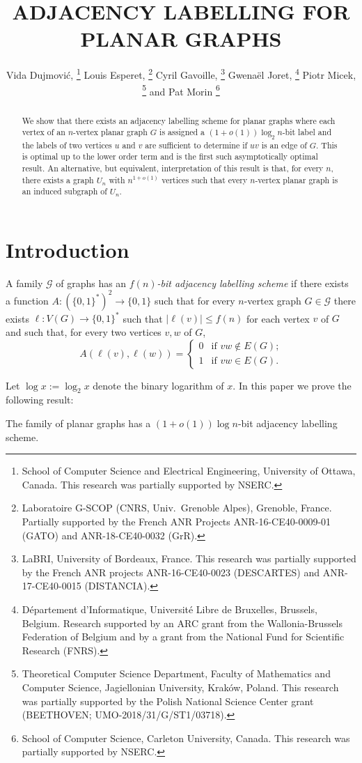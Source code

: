 \documentclass[kpfonts]{patmorin}
\title{\MakeUppercase{Adjacency Labelling for Planar Graphs}}
\author{
  Vida Dujmović,%
    \thanks{School of Computer Science and Electrical Engineering, University of Ottawa, Canada. This research was partially supported by NSERC.}\quad
  Louis Esperet,%
    \thanks{Laboratoire G-SCOP (CNRS, Univ.\ Grenoble Alpes), Grenoble, France. Partially supported by the French ANR Projects ANR-16-CE40-0009-01 (GATO) and ANR-18-CE40-0032 (GrR).}\quad
  Cyril Gavoille,%
    \thanks{LaBRI, University of Bordeaux, France. This research was partially supported by the French ANR projects ANR-16-CE40-0023 (DESCARTES) and ANR-17-CE40-0015 (DISTANCIA).}\quad
  Gwenaël Joret,%
     \thanks{Département d'Informatique, Université Libre de Bruxelles, Brussels, Belgium. Research supported by an ARC grant from the Wallonia-Brussels Federation of Belgium and by a grant from the National Fund for Scientific Research (FNRS).}\quad
  Piotr Micek,%
    \thanks{Theoretical Computer Science Department, Faculty of Mathematics and Computer Science, Jagiellonian University, Krak\'{o}w, Poland. This research was partially supported by the Polish National Science Center grant (BEETHOVEN; UMO-2018/31/G/ST1/03718).}\newline
  and Pat Morin%
    \thanks{School of Computer Science, Carleton University, Canada. This research was partially supported by NSERC.}
}
\date{}
\let\le\leqslant
\begin{document}
\begin{titlepage}
\maketitle

\begin{abstract}
  We show that there exists an adjacency labelling scheme for planar graphs where each vertex of an $n$-vertex planar graph $G$ is assigned a $(1+o(1))\log_2 n$-bit label and the labels of two vertices $u$ and $v$ are sufficient to determine if $uv$ is an edge of $G$.  This is optimal up to the lower order term and is the first such asymptotically optimal result.  An alternative, but equivalent, interpretation of this result is that, for every $n$, there exists a graph $U_n$ with $n^{1+o(1)}$ vertices such that every $n$-vertex planar graph is an induced subgraph of $U_n$. 
\end{abstract}
\end{titlepage}
\tableofcontents

\newpage

\setcounter{page}{0}
\section{Introduction}


A family $\mathcal{G}$ of graphs has an \emph{$f(n)$-bit adjacency labelling scheme} if there exists a function $A:(\{0,1\}^*)^2\to \{0,1\}$ such that for every $n$-vertex graph $G\in \mathcal{G}$ there exists $\ell:V(G)\to\{0,1\}^*$ such that $|\ell(v)|\le f(n)$ for each vertex $v$ of $G$ and such that, for every two vertices $v,w$ of $G$,
\[  A(\ell(v),\ell(w)) = 
      \begin{cases} 
        0 & \text{if $vw\not\in E(G)$;} \\
        1 & \text{if $vw\in E(G)$.}
      \end{cases}
\]

Let $\log x:=\log_2 x$ denote the binary logarithm of $x$. 
In this paper we prove the following result:
\begin{thm}
  The family of planar graphs has a $(1+o(1))\log n$-bit adjacency labelling scheme.
\end{thm}
\end{document}
